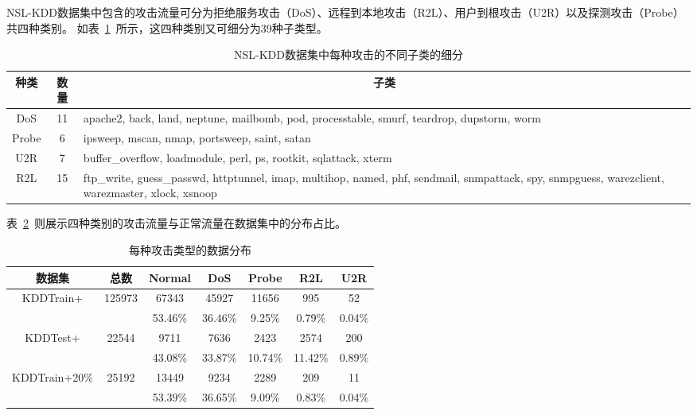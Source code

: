 NSL-KDD数据集中包含的攻击流量可分为拒绝服务攻击（DoS）、远程到本地攻击（R2L）、用户到根攻击（U2R）以及探测攻击（Probe）共四种类别。
如表~\ref{tab:attack_class}~所示，这四种类别又可细分为39种子类型。
\begin{table}[h]
  \caption{NSL-KDD数据集中每种攻击的不同子类的细分}
  \label{tab:attack_class}
  \begin{tabularx}{\textwidth}{@{}ccX@{}}
  \toprule
    \multicolumn{1}{c}{\textbf{种类}} & \multicolumn{1}{c}{\textbf{数量}} & \multicolumn{1}{c}{\textbf{子类}}\\
  \midrule
    DoS & 11 & apache2, back, land, neptune, mailbomb, pod, processtable, smurf, teardrop, dupstorm, worm\\
    Probe & 6 & ipsweep, mscan, nmap, portsweep, saint, satan\\
    U2R & 7 & buffer\_overflow, loadmodule, perl, ps, rootkit, sqlattack, xterm\\
    R2L & 15 & ftp\_write, guess\_passwd, httptunnel, imap, multihop, named, phf, sendmail, snmpattack, spy, snmpguess, warezclient, warezmaster, xlock, xsnoop\\
  \bottomrule
  \end{tabularx}
\end{table}

表~\ref{tab:kdd_distribution}~则展示四种类别的攻击流量与正常流量在数据集中的分布占比。
\begin{table}[h]
  \caption{每种攻击类型的数据分布}
  \label{tab:kdd_distribution}
  \centering
  \begin{tabular}{ccccccc}
  \toprule
  \textbf{数据集} & \textbf{总数} & \textbf{Normal} & \textbf{DoS} & \textbf{Probe} & \textbf{R2L} & \textbf{U2R}\\
  \midrule
  \multirow{2}{*}{KDDTrain+} & \multirow{2}{*}{125973} & 67343 & 45927 & 11656 & 995  & 52   \\
                             &                          &53.46\%& 36.46\% & 9.25\%&0.79\%&0.04\%\\
  \multirow{2}{*}{KDDTest+} & \multirow{2}{*}{22544} & 9711 & 7636 & 2423 & 2574 & 200\\
                            &                           & 43.08\% & 33.87\%& 10.74\%& 11.42\%&0.89\%\\
  \multirow{2}{*}{KDDTrain+20\%} & \multirow{2}{*}{25192} & 13449 & 9234 & 2289 & 209 & 11\\
                                 &                      & 53.39\% & 36.65\%& 9.09\%& 0.83\%&0.04\%\\
  \bottomrule
  \end{tabular}
\end{table}

